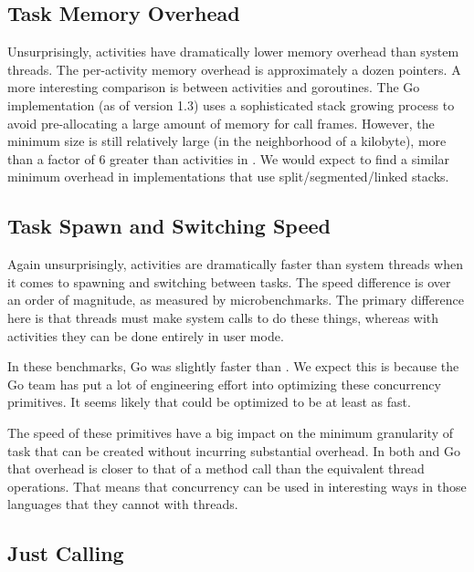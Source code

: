 \documentclass[9pt,preprint]{sigplanconf}
\begin{document}
\subsection{Task Memory Overhead}

Unsurprisingly, activities have dramatically lower memory overhead than system threads.
The per-activity memory overhead is approximately a dozen pointers.
A more interesting comparison is between activities and goroutines.
The Go implementation (as of version 1.3) uses a sophisticated stack growing process to avoid pre-allocating a large amount of memory for call frames.
However, the minimum size is still relatively large (in the neighborhood of a kilobyte), more than a factor of 6 greater than activities in \charcoal{}.
We would expect to find a similar minimum overhead in implementations that use split/segmented/linked stacks.


\subsection{Task Spawn and Switching Speed}

Again unsurprisingly, activities are dramatically faster than system threads when it comes to spawning and switching between tasks.
The speed difference is over an order of magnitude, as measured by microbenchmarks.
The primary difference here is that threads must make system calls to do these things, whereas with activities they can be done entirely in user mode.

In these benchmarks, Go was slightly faster than \charcoal{}.
We expect this is because the Go team has put a lot of engineering effort into optimizing these concurrency primitives.
It seems likely that \charcoal{} could be optimized to be at least as fast.

The speed of these primitives have a big impact on the minimum granularity of task that can be created without incurring substantial overhead.
In both \charcoal{} and Go that overhead is closer to that of a method call than the equivalent thread operations.
That means that concurrency can be used in interesting ways in those languages that they cannot with threads.

\subsection{Just Calling}
\end{document}
